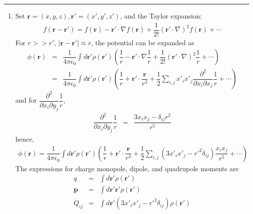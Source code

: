 \documentclass[a4paper,11pt]{article}
\begin{document}
\begin{enumerate}
\begin{enumerate}
    \end{enumerate}
    \rule[0pt]{6cm}{0.05em}
    \begin{enumerate}
        \item Set $\boldsymbol{r}=(x,y,z),\boldsymbol{r}'=(x',y',z')$, and the Taylor expansion:
        \begin{eqnarray}
            f(\boldsymbol{r}-\boldsymbol{r}')=f(\boldsymbol{r})-\boldsymbol{r}'\cdot\nabla f(\boldsymbol{r})+\dfrac{1}{2!}(\boldsymbol{r}'\cdot\nabla)^2 f(\boldsymbol{r})+\dotsm
        \end{eqnarray}
        For $r>>r'$, $|\boldsymbol{r}-\boldsymbol{r}'|\approx r$, the potential can be expanded as 
        \begin{eqnarray}
            \phi(\boldsymbol{r})
            &=&\dfrac{1}{4\pi\epsilon_0}\int d\boldsymbol{r}'\rho(\boldsymbol{r}')\left(\dfrac{1}{r}-\boldsymbol{r}'\cdot\nabla \dfrac{1}{r}+\dfrac{1}{2!}(\boldsymbol{r}'\cdot\nabla)^2\dfrac{1}{r}+\dotsm\right) \nonumber \\
            &=&\dfrac{1}{4\pi\epsilon_0}\int d\boldsymbol{r}'\rho(\boldsymbol{r}')\left(\dfrac{1}{r}+\boldsymbol{r}'\cdot\dfrac{\boldsymbol{r}}{r^3}+\dfrac{1}{2}\sum\limits_{i,j}x'_i x'_j\dfrac{\partial^2}{\partial x_i \partial x_j}\dfrac{1}{r}+\dotsm\right)
        \end{eqnarray}
        and for $\dfrac{\partial^2}{\partial x_i\partial y_j}\dfrac{1}{r}$,
        \begin{eqnarray}
            \dfrac{\partial^2}{\partial x_i\partial y_j}\dfrac{1}{r}
            &=&\dfrac{3x_i x_j-\delta_{ij}r^2}{r^5}
        \end{eqnarray}
        hence,
        \begin{eqnarray}
            \phi(\boldsymbol{r})
            =\dfrac{1}{4\pi\epsilon_0}\int d\boldsymbol{r}'\rho(\boldsymbol{r}')\left(\dfrac{1}{r}+\boldsymbol{r}'\cdot\dfrac{\boldsymbol{r}}{r^3}+\dfrac{1}{2}\sum\limits_{i,j}(3x'_ix'_j-r'^2\delta_{ij})\dfrac{x_ix_j}{r^5}+\dotsm\right)
        \end{eqnarray}
        The expressions for charge monopole, dipole, and quadrupole moments are
        \begin{eqnarray}
            q&=&\int d\boldsymbol{r}'\rho(\boldsymbol{r}') \\
            \boldsymbol{p}&=&\int d\boldsymbol{r}'\boldsymbol{r}'\rho(\boldsymbol{r}') \\
            Q_{ij}&=&\int d\boldsymbol{r}'(3x'_ix'_j-r'^2\delta_{ij})\rho(\boldsymbol{r}') \\

\end{eqnarray}
\end{enumerate}
\end{enumerate}
\end{document}
